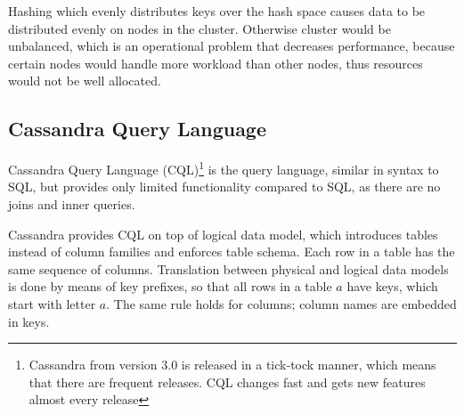 Hashing which evenly distributes keys over the hash space causes data to be distributed evenly on nodes in the cluster. Otherwise cluster would be unbalanced, which is an operational problem that decreases performance, because certain nodes would handle more workload than other nodes, thus resources would not be well allocated.







\subsection{Cassandra Query Language}
\label{sec:theory:cassandra:cql}
Cassandra Query Language (CQL)\footnote{Cassandra from version 3.0 is released in a tick-tock manner, which means that there are frequent releases. CQL changes fast and gets new features almost every release} is the query language, similar in syntax to SQL, but provides only limited functionality compared to SQL, as there are no joins and inner queries. 

Cassandra provides CQL on top of logical data model, which introduces tables instead of column families and enforces table schema. Each row in a table has the same sequence of columns. Translation between physical and logical data models is done by means of key prefixes, so that all rows in a table $a$ have keys, which start with letter $a$. The same rule holds for columns; column names are embedded in keys.

